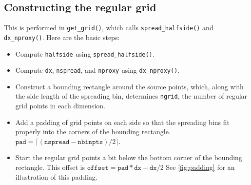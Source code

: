\documentclass[11pt]{article}
\begin{document}
\subsection{Constructing the regular grid}
This is performed in \texttt{get\_grid()}, which calls \texttt{spread\_halfside()} and \texttt{dx\_nproxy()}. Here are the basic steps:
\begin{itemize}
    \item Compute \texttt{halfside} using \texttt{spread\_halfside()}.
    \item Compute \texttt{dx}, \texttt{nspread}, and \texttt{nproxy} using \texttt{dx\_nproxy()}.
    \item Construct a bounding rectangle around the source points, which, along with the side length of the spreading bin, determines \texttt{ngrid}, the number of regular grid points in each dimension.
    \item Add a padding of grid points on each side so that the spreading bins fit properly into the corners of the bounding rectangle. $\texttt{pad} = \lceil (\texttt{nspread} - \texttt{nbinpts}) / 2 \rceil$.
    \item Start the regular grid points a bit below the bottom corner of the bounding rectangle. This offset is $\texttt{offset} = \texttt{pad} * \texttt{dx} - \texttt{dx} / 2$ See \cref{fig:padding} for an illustration of this padding.
\end{itemize}
\end{document}
